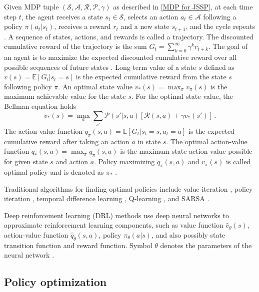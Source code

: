 Given MDP tuple $(\mathcal{S}, \mathcal{A}, \mathcal{R}, \mathcal{P}, \gamma)$ as described in \ref{MDP for JSSP}, at each time step $t$, the agent receives a state $s_t \in \mathcal{S}$, selects an action $a_t \in \mathcal{A}$ following a policy $\pi(a_t|s_t)$, receives a reward $r_t$ and a new state $s_{t+1}$, and the cycle repeats \cite{DBLP:journals/corr/Li17b}. A sequence of states, actions, and rewards is called a trajectory. The discounted cumulative reward of the trajectory is the sum $G_t = \sum_{k=0}^\infty \gamma^k r_{t+k}$. The goal of an agent is to maximize the expected discounted cumulative reward over all possible sequences of future states \cite{DBLP:journals/corr/Li17b}. Long term value of a state $s$ defined as $v(s) = \mathbb{E}\left [ G_t | s_t = s \right ]$ is the expected cumulative reward from the state $s$ following policy $\pi$. An optimal state value $v_*(s) = \max_\pi v_\pi(s)$ is the maximum achievable value for the state $s$. For the optimal state value, the Bellman equation holds \cite{DBLP:journals/corr/Li17b}
\begin{equation}
	v_*(s) = \max_a \sum_{s'} \mathcal{P} (s' | s,a)\left [ \mathcal{R}(s, a) + \gamma v_*(s') \right ] \, .
\end{equation}
The action-value function $q_\pi(s,a) = \mathbb{E} \left [ G_t | s_t=s, a_t=a\right ]$ is the expected cumulative reward after taking an action $a$ in state $s$. The optimal action-value function $q_* (s,a) = \max_\pi q_\pi(s, a)$ is the maximum state-action value possible for given state $s$ and action $a$. Policy maximizing $q_\pi(s,a)$ and $v_\pi(s)$ is called optimal policy and is denoted as $\pi_*$ \cite{DBLP:journals/corr/Li17b}.
\par
Traditional algorithms for finding optimal policies include value iteration \cite{barto1989learning}, policy iteration \cite{Howard1960DynamicPA}, temporal difference learning \cite{tesauro1995temporal}, Q-learning \cite{watkins1992q}, and SARSA \cite{sarsa}.
\par
Deep reinforcement learning (DRL) methods use deep neural networks to approximate reinforcement learning components, such as value function $\hat{v}_\theta(s)$, action-value function $\hat{q}_\theta(s, a)$, policy $\pi_\theta(a|s)$, and also possibly state transition function and reward function. Symbol $\theta$ denotes the parameters of the neural network \cite{DBLP:journals/corr/Li17b}. 

\subsection{Policy optimization}

